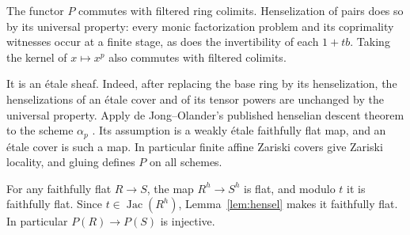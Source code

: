 \documentclass[11pt]{article}
\theoremstyle{definition}\newtheorem{definition}[theorem]{Definition}
\theoremstyle{remark}\newtheorem{remark}[theorem]{Remark}
\newcommand{\Jac}{\operatorname{Jac}}
\begin{document}
The functor $P$ commutes with filtered ring colimits. Henselization of pairs does so by its universal property: every monic factorization problem and its coprimality witnesses occur at a finite stage, as does the invertibility of each $1+tb$. Taking the kernel of $x\mapsto x^p$ also commutes with filtered colimits.

It is an \'etale sheaf. Indeed, after replacing the base ring by its henselization, the henselizations of an \'etale cover and of its tensor powers are unchanged by the universal property. Apply de Jong--Olander's published henselian descent theorem to the scheme $\alpha_p$ \cite[Theorem 2, p.~2]{dJO}. Its assumption is a weakly \'etale faithfully flat map, and an \'etale cover is such a map. In particular finite affine Zariski covers give Zariski locality, and gluing defines $P$ on all schemes.

For any faithfully flat $R\to S$, the map $R^h\to S^h$ is flat, and modulo $t$ it is faithfully flat. Since $t\in\Jac(R^h)$, Lemma~\ref{lem:hensel} makes it faithfully flat. In particular $P(R)\to P(S)$ is injective.
\end{document}
